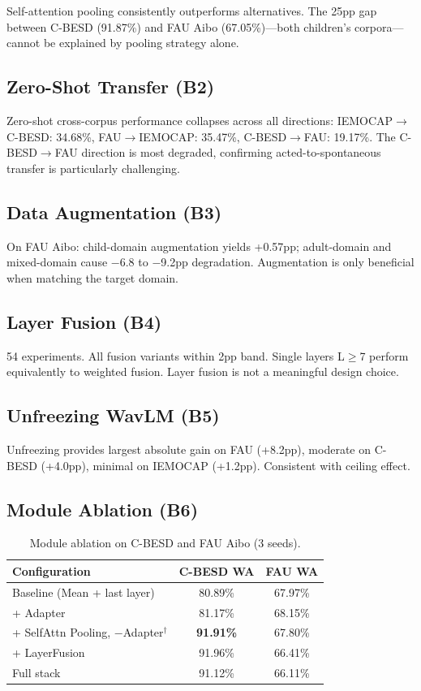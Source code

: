 \documentclass[11pt,a4paper]{article}
\begin{document}
Self-attention pooling consistently outperforms alternatives. The 25pp gap between C-BESD (91.87\%) and FAU Aibo (67.05\%)---both children's corpora---cannot be explained by pooling strategy alone.

\subsection{Zero-Shot Transfer (B2)}

Zero-shot cross-corpus performance collapses across all directions: IEMOCAP$\rightarrow$C-BESD: 34.68\%, FAU$\rightarrow$IEMOCAP: 35.47\%, C-BESD$\rightarrow$FAU: 19.17\%. The C-BESD$\rightarrow$FAU direction is most degraded, confirming acted-to-spontaneous transfer is particularly challenging.

\subsection{Data Augmentation (B3)}

On FAU Aibo: child-domain augmentation yields +0.57pp; adult-domain and mixed-domain cause $-$6.8 to $-$9.2pp degradation. Augmentation is only beneficial when matching the target domain.

\subsection{Layer Fusion (B4)}

54 experiments. All fusion variants within 2pp band. Single layers L$\geq$7 perform equivalently to weighted fusion. Layer fusion is not a meaningful design choice.

\subsection{Unfreezing WavLM (B5)}

Unfreezing provides largest absolute gain on FAU (+8.2pp), moderate on C-BESD (+4.0pp), minimal on IEMOCAP (+1.2pp). Consistent with ceiling effect.

\subsection{Module Ablation (B6)}

\begin{table}[h]
\centering
\caption{Module ablation on C-BESD and FAU Aibo (3 seeds).}
\begin{tabular}{lcc}
\hline
\textbf{Configuration} & \textbf{C-BESD WA} & \textbf{FAU WA} \\
\hline
Baseline (Mean + last layer) & 80.89\% & 67.97\% \\
+ Adapter & 81.17\% & 68.15\% \\
+ SelfAttn Pooling, $-$Adapter$^\dagger$ & \textbf{91.91\%} & 67.80\% \\
+ LayerFusion & 91.96\% & 66.41\% \\
Full stack & 91.12\% & 66.11\% \\
\hline
\end{tabular}
\end{table}
\end{document}
